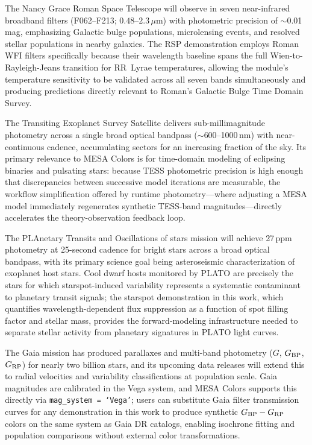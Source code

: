 \documentclass[linenumbers,apj,twocolumn, floatfix]{aastex701}
\begin{document}
The Nancy Grace Roman Space Telescope \citep{roman} will observe in seven
near-infrared broadband filters (F062--F213; $0.48$--$2.3\,\mu$m) with photometric
precision of $\sim$0.01\,mag, emphasizing Galactic bulge populations, microlensing
events, and resolved stellar populations in nearby galaxies. The RSP demonstration
employs Roman WFI filters specifically because their wavelength baseline spans the
full Wien-to-Rayleigh-Jeans transition for RR~Lyrae temperatures, allowing the
module's temperature sensitivity to be validated across all seven bands simultaneously
and producing predictions directly relevant to Roman's Galactic Bulge Time Domain
Survey.

The Transiting Exoplanet Survey Satellite \citep[TESS;][]{tess} delivers
sub-millimagnitude photometry across a single broad optical bandpass ($\sim$600--1000\,nm)
with near-continuous cadence, accumulating sectors for an increasing fraction of the
sky. Its primary relevance to MESA Colors is for time-domain modeling of eclipsing
binaries and pulsating stars: because TESS photometric precision is high enough that
discrepancies between successive model iterations are measurable, the workflow
simplification offered by runtime photometry---where adjusting a MESA model
immediately regenerates synthetic TESS-band magnitudes---directly accelerates the
theory-observation feedback loop.

The PLAnetary Transits and Oscillations of stars mission \citep{plato} will achieve
27\,ppm photometry at 25-second cadence for bright stars across a broad optical
bandpass, with its primary science goal being asteroseismic characterization of
exoplanet host stars. Cool dwarf hosts monitored by PLATO are precisely the stars
for which starspot-induced variability represents a systematic contaminant to
planetary transit signals; the starspot demonstration in this work, which quantifies
wavelength-dependent flux suppression as a function of spot filling factor and stellar
mass, provides the forward-modeling infrastructure needed to separate stellar
activity from planetary signatures in PLATO light curves.

The Gaia mission \citep{gaia_edr3_2} has produced parallaxes and multi-band
photometry ($G$, $G_{\rm BP}$, $G_{\rm RP}$) for nearly two billion stars, and its
upcoming data releases will extend this to radial velocities and variability
classifications at population scale. Gaia magnitudes are calibrated in the Vega
system, and MESA Colors supports this directly via \texttt{mag\_system = `Vega'};
users can substitute Gaia filter transmission curves for any demonstration in this
work to produce synthetic $G_{\rm BP} - G_{\rm RP}$ colors on the same system as
Gaia DR catalogs, enabling isochrone fitting and population comparisons without
external color transformations.
\end{document}
